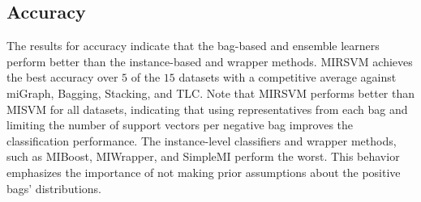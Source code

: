 \documentclass[reqno]{vcuthesis}
\numberwithin{equation}{chapter}
\begin{document}
\begin{table}[b!]
{}\vspace{-1.3em}
\label{fig:BonfDunnacc}\vspace{-1.3em}
\label{tab:MIstatacc}
\vspace{-1em}
\scriptsize
{}
\end{table}
\subsection{Accuracy}
The results for accuracy indicate that the bag-based and ensemble learners perform better than the instance-based and wrapper methods. MIRSVM achieves the best accuracy over $5$ of the $15$ datasets with a competitive average against miGraph, Bagging, Stacking, and TLC. Note that MIRSVM performs better than MISVM for all datasets, indicating that using representatives from each bag and limiting the number of support vectors per negative bag improves the classification performance. The instance-level classifiers and wrapper methods, such as MIBoost, MIWrapper, and SimpleMI perform the worst. This behavior emphasizes the importance of not making prior assumptions about the positive bags' distributions. 
\end{document}
